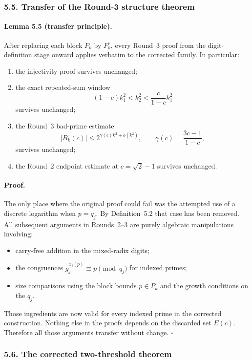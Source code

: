 \subsubsection*{5.5. Transfer of the Round-3 structure theorem}

\paragraph{Lemma 5.5 (transfer principle).}
After replacing each block $P_k$ by $P_k^{\circ}$, every Round~3 proof from the digit-definition stage onward applies verbatim to the corrected family.
In particular:
\begin{enumerate}
\item the injectivity proof survives unchanged;
\item the exact repeated-sum window
\[
(1-c)k_1^2<k_2^2<\frac{c}{1-c}k_1^2
\]
survives unchanged;
\item the Round~3 bad-prime estimate
\[
|B_k^{\circ}(c)|\le 2^{\gamma(c)k^2+o(k^2)},
\qquad \gamma(c)=\frac{3c-1}{1-c},
\]
survives unchanged;
\item the Round~2 endpoint estimate at $c=\sqrt2-1$ survives unchanged.
\end{enumerate}

\paragraph{Proof.}
The only place where the original proof could fail was the attempted use of a discrete logarithm when $p=q_j$.
By Definition~5.2 that case has been removed.
All subsequent arguments in Rounds~2--3 are purely algebraic manipulations involving:
\begin{itemize}
\item carry-free addition in the mixed-radix digits;
\item the congruences $g_j^{x_j(p)}\equiv p\pmod{q_j}$ for indexed primes;
\item size comparisons using the block bounds $p\in P_k$ and the growth conditions on the $q_j$.
\end{itemize}
Those ingredients are now valid for every indexed prime in the corrected construction.
Nothing else in the proofs depends on the discarded set $E(c)$.
Therefore all those arguments transfer without change. \hfill$\square$

\subsubsection*{5.6. The corrected two-threshold theorem}


